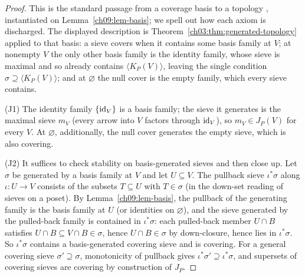 \begin{proof}
This is the standard passage from a coverage basis to a topology \cite{stacks00ZC}, instantiated on Lemma~\ref{ch09:lem-basis}; we spell out how each axiom is discharged. The displayed description is Theorem~\ref{ch03:thm:generated-topology} applied to that basis: a sieve covers when it contains some basis family at $V$; at nonempty $V$ the only other basis family is the identity family, whose sieve is maximal and so already contains $\langle K_{P}(V)\rangle$, leaving the single condition $\sigma\supseteq\langle K_{P}(V)\rangle$; and at $\varnothing$ the null cover is the empty family, which every sieve contains.

(J1) The identity family $\{\mathrm{id}_{V}\}$ is a basis family; the sieve it generates is the maximal sieve $m_{V}$ (every arrow into $V$ factors through $\mathrm{id}_{V}$), so $m_{V}\in J_{P}(V)$ for every $V$. At $\varnothing$, additionally, the null cover generates the empty sieve, which is also covering.

(J2) It suffices to check stability on basis-generated sieves and then close up. Let $\sigma$ be generated by a basis family at $V$ and let $U\subseteq V$. The pullback sieve $\iota^{*}\sigma$ along $\iota:U\to V$ consists of the subsets $T\subseteq U$ with $T\in\sigma$ (in the down-set reading of sieves on a poset). By Lemma~\ref{ch09:lem-basis}, the pullback of the generating family is the basis family at $U$ (or identities on $\varnothing$), and the sieve generated by the pulled-back family is contained in $\iota^{*}\sigma$: each pulled-back member $U\cap B$ satisfies $U\cap B\subseteq V\cap B\in\sigma$, hence $U\cap B\in\sigma$ by down-closure, hence lies in $\iota^{*}\sigma$. So $\iota^{*}\sigma$ contains a basis-generated covering sieve and is covering. For a general covering sieve $\sigma'\supseteq\sigma$, monotonicity of pullback gives $\iota^{*}\sigma'\supseteq\iota^{*}\sigma$, and supersets of covering sieves are covering by construction of $J_{P}$.


\end{proof}
